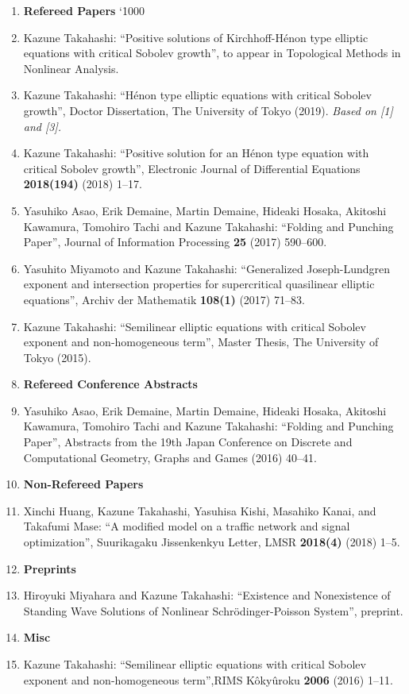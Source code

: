 \begin{enumerate}
  \item[] {\bf Refereed Papers}
  \sfcode`\.1000 %
  \item Kazune Takahashi: ``Positive solutions of Kirchhoff-Hénon type elliptic equations with critical Sobolev growth'', to appear in Topological Methods in Nonlinear Analysis.
  \item Kazune Takahashi: ``Hénon type elliptic equations with critical Sobolev growth'', Doctor Dissertation, The University of Tokyo (2019). {\it Based on [1] and [3].}
  \item Kazune Takahashi: ``Positive solution for an Hénon type equation with critical Sobolev growth'', Electronic Journal of Differential Equations {\bf 2018(194)} (2018) 1--17.
  \item Yasuhiko Asao, Erik Demaine, Martin Demaine, Hideaki Hosaka, Akitoshi Kawamura, Tomohiro Tachi and Kazune Takahashi: ``Folding and Punching Paper'', Journal of Information Processing {\bf 25} (2017) 590--600.
  \item Yasuhito Miyamoto and Kazune Takahashi: ``Generalized Joseph-Lundgren exponent and intersection properties for supercritical quasilinear elliptic equations'', Archiv der Mathematik {\bf 108(1)} (2017) 71--83.
  \item Kazune Takahashi: ``Semilinear elliptic equations with critical Sobolev exponent and non-homogeneous term'', Master Thesis, The University of Tokyo (2015).
  \item[] {\bf Refereed Conference Abstracts}
  \item Yasuhiko Asao, Erik Demaine, Martin Demaine, Hideaki Hosaka, Akitoshi Kawamura, Tomohiro Tachi and Kazune Takahashi: ``Folding and Punching Paper'', Abstracts from the 19th Japan Conference on Discrete and Computational Geometry, Graphs and Games (2016) 40--41.
  \item[] {\bf Non-Refereed Papers}
  \item Xinchi Huang, Kazune Takahashi, Yasuhisa Kishi, Masahiko Kanai, and Takafumi Mase: ``A modified model on a traffic network and signal optimization'', Suurikagaku Jissenkenkyu Letter, LMSR {\bf 2018(4)} (2018) 1--5.
  \item[] {\bf Preprints}
  \item Hiroyuki Miyahara and Kazune Takahashi: ``Existence and Nonexistence of Standing Wave Solutions of Nonlinear Schr\"{o}dinger-Poisson System'', preprint.
  \item[] {\bf Misc}
  \item Kazune Takahashi: ``Semilinear elliptic equations with critical Sobolev exponent and non-homogeneous term'',RIMS K\^{o}ky\^{u}roku {\bf 2006} (2016) 1--11.
\end{enumerate}


